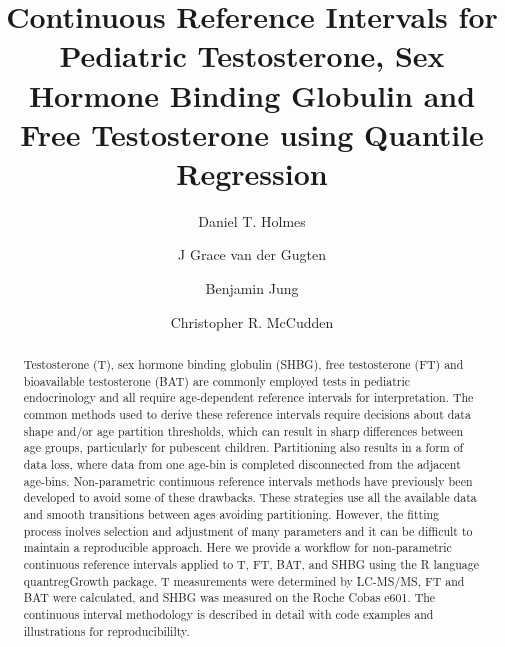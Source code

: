 \documentclass[]{elsarticle} %
\begin{document}
\begin{frontmatter}

  \title{Continuous Reference Intervals for Pediatric Testosterone, Sex
Hormone Binding Globulin and Free Testosterone using Quantile
Regression}
    \author[SPH,UBC]{Daniel T. Holmes}
    \author[SPH]{J Grace van der Gugten}
    \author[HSC]{Benjamin Jung}
    \author[UO,TOH,EORLA]{Christopher R. McCudden}
      \address[SPH]{St.~Paul's Hospital Department of Pathology and
Laboratory Medicine, 1081 Burrard St., Vancouver, BC V6Z 1Y6 Canada}
    \address[UBC]{University of British Columbia Department of Pathology
and Laboratory Medicine, 2211 Wesbrook Mall, Vancouver, BC V6T 1Z7
Canada}
    \address[TOH]{Department of Pathology and Laboratory Medicine,
Ottawa Hospital, General Campus, 501 Smyth Road, Ottawa, ON K1H 8L6
Canada}
    \address[UO]{Department of Pathology and Laboratory Medicine,
University of Ottawa}
    \address[EORLA]{Eastern Ontario Regional Laboratory Association}
    \address[HSC]{Hospital for Sick Children (SickKids), 555 University
Ave., Department of Paediatric Laboratory Medicine, Toronto, ON, M5G
1X8}
  
  \begin{abstract}
  Testosterone (T), sex hormone binding globulin (SHBG), free
  testosterone (FT) and bioavailable testosterone (BAT) are commonly
  employed tests in pediatric endocrinology and all require
  age-dependent reference intervals for interpretation. The common
  methods used to derive these reference intervals require decisions
  about data shape and/or age partition thresholds, which can result in
  sharp differences between age groups, particularly for pubescent
  children. Partitioning also results in a form of data loss, where data
  from one age-bin is completed disconnected from the adjacent age-bins.
  Non-parametric continuous reference intervals methods have previously
  been developed to avoid some of these drawbacks. These strategies use
  all the available data and smooth transitions between ages avoiding
  partitioning. However, the fitting process inolves selection and
  adjustment of many parameters and it can be difficult to maintain a
  reproducible approach. Here we provide a workflow for non-parametric
  continuous reference intervals applied to T, FT, BAT, and SHBG using
  the R language quantregGrowth package. T measurements were determined
  by LC-MS/MS, FT and BAT were calculated, and SHBG was measured on the
  Roche Cobas e601. The continuous interval methodology is described in
  detail with code examples and illustrations for reproducibililty.
  \end{abstract}
  
 \end{frontmatter}
\end{document}
